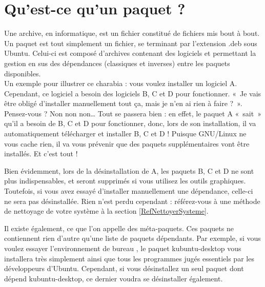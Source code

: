 {\section{Qu'est-ce qu'un paquet ?}
Une archive, en informatique, est un fichier constitué de fichiers mis bout à bout. Un paquet est tout simplement un fichier, se terminant par l'extension .deb sous Ubuntu. Celui-ci est composé d'archives contenant des logiciels et permettant la gestion en sus des dépendances (classiques et inverses) entre les paquets disponibles.\\
Un exemple pour illustrer ce charabia : vous voulez installer un logiciel A. Cependant, ce logiciel a besoin des logiciels B, C et D pour fonctionner. «~Je vais être obligé d'installer manuellement tout ça, mais je n'en ai rien à faire ?~». Pensez-vous ? Non non non\ldots{} Tout se passera bien : en effet, le paquet A «~sait~» qu'il a besoin de B, C et D pour fonctionner, donc, lors de son installation, il va automatiquement télécharger et installer B, C et D ! Puisque GNU/Linux ne vous cache rien, il va vous prévenir que des paquets supplémentaires vont être installés. Et c'est tout !\par
Bien évidemment, lors de la désinstallation de A, les paquets B, C et D ne sont plus indispensables, et seront supprimés si vous utilisez les outils graphiques. Toutefois, si vous avez essayé d'installer manuellement une dépendance, celle-ci ne sera pas désinstallée. Rien n'est perdu cependant : référez-vous à une méthode de nettoyage de votre système à la section \ref{RefNettoyerSysteme}. 
\begin{nota}
Il existe également, ce que l'on appelle des méta-paquets. Ces paquets ne contiennent rien d'autre qu'une liste de paquets dépendants. Par exemple, si vous voulez essayer l'environnement de bureau , le paquet kubuntu-desktop vous installera très simplement  ainsi que tous les programmes  jugés essentiels par les développeurs d'Ubuntu. Cependant, si vous désinstallez un seul paquet dont dépend kubuntu-desktop, ce dernier voudra se désinstaller également.
\end{nota}
}

